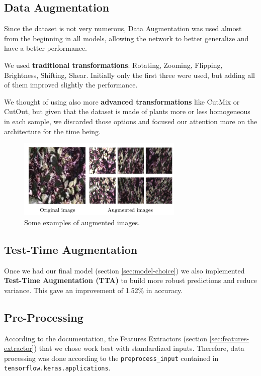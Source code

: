 \documentclass[conference,compsoc,11pt]{IEEEtran}
\begin{document}
\subsection{Data Augmentation}

Since the dataset is not very numerous, Data Augmentation was used almost from the beginning in all models, allowing the network to better generalize and have a better performance.

We used \textbf{traditional transformations}: Rotating, Zooming, Flipping, Brightness, Shifting, Shear.
Initially only the first three were used, but adding all of them improved slightly the performance.

We thought of using also more \textbf{advanced transformations} like CutMix or CutOut, but given that the dataset is made of plants more or less homogeneous in each sample, we discarded those options and focused our attention more on the architecture for the time being.

\begin{figure}[h!]
\centering
\includegraphics[width=3.1in]{single_augmentation.jpg}
\caption{Some examples of augmented images.}
\end{figure}

\subsection{Test-Time Augmentation}\label{sec:tta}

Once we had our final model (section \ref{sec:model-choice}) we also implemented \textbf{Test-Time Augmentation (TTA)} to build more robust predictions and reduce variance. This gave an improvement of 1.52\% in accuracy.

\subsection{Pre-Processing}

According to the documentation, the Features Extractors (section \ref{sec:features-extractor}) that we chose work best with standardized inputs. Therefore, data processing was done according to the \verb|preprocess_input| contained in \verb|tensorflow.keras.applications|.
\end{document}
